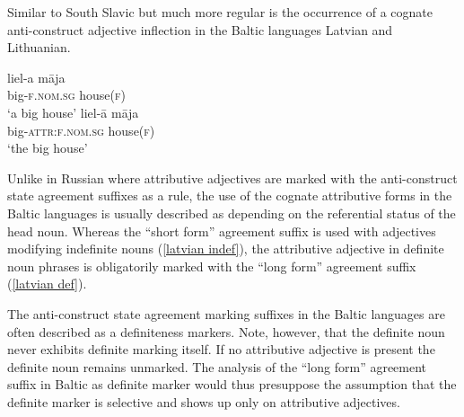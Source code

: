 Similar to South Slavic but much more regular is the occurrence of a cognate anti\hyp{}construct adjective inflection in the Baltic languages Latvian and Lithuanian.
\begin{exe}
\ex
{}
\begin{xlist}
\ex
\label{latvian indef}
\gll liel-a māja\\
	big-\textsc{f.nom.sg} house(\textsc{f})\\
\glt	‘a big house’
\ex
\label{latvian def}
\gll liel-ā māja\\
	big-\textsc{attr:f.nom.sg} house(\textsc{f})\\
\glt	‘the big house’
\end{xlist}
\end{exe}
Unlike in Russian where attributive adjectives are marked with the anti\hyp{}construct state agreement suffixes as a rule, the use of the cognate attributive forms in the Baltic languages is usually described as depending on the referential status of the head noun. Whereas the “short form” agreement suffix is used with adjectives modifying indefinite nouns (\ref{latvian indef}), the attributive adjective in definite noun phrases is obligatorily marked with the “long form” agreement suffix (\ref{latvian def}).

The anti\hyp{}construct state agreement marking suffixes in the Baltic languages are often described as a definiteness markers. Note, however, that the definite noun never exhibits definite marking itself. If no attributive adjective is present the definite noun remains unmarked. The analysis of the “long form” agreement suffix in Baltic as definite marker would thus presuppose the assumption that the definite marker is selective and shows up only on attributive adjectives. 

